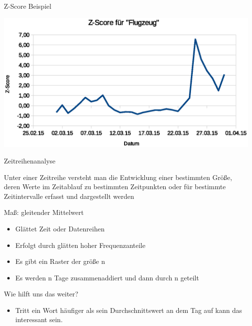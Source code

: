 \documentclass{beamer}
\begin{document}
\begin{frame}{Z-Score Beispiel}
	\hspace{1cm}
	\begin{centering}
		\includegraphics[width=1\textwidth]{pictures/zscore_flugzeug}
	\end{centering}
\end{frame}


\begin{frame}{Zeitreihenanalyse}
 \begin{definition}[Zeitreihenanalyse]
 	Unter einer Zeitreihe
	versteht man die Entwicklung einer bestimmten Größe, deren Werte im Zeitablauf zu bestimmten Zeitpunkten oder für bestimmte Zeitintervalle erfasst und dargestellt
	werden
 \end{definition}
	
\end{frame}

\begin{frame}{Maß: gleitender Mittelwert}
	\begin{itemize}
		\item Glättet Zeit oder Datenreihen
		\item Erfolgt durch glätten hoher Frequenzanteile
		\item Es gibt ein Raster der größe n		
		\item Es werden n Tage zusammenaddiert und dann durch n geteilt
	\end{itemize}
	
	Wie hilft uns das weiter?
	
	\begin{itemize}
		\item Tritt ein Wort häufiger als sein Durchschnittswert an dem Tag auf kann das interessant sein.
	\end{itemize}		
	
\end{frame}
\end{document}
